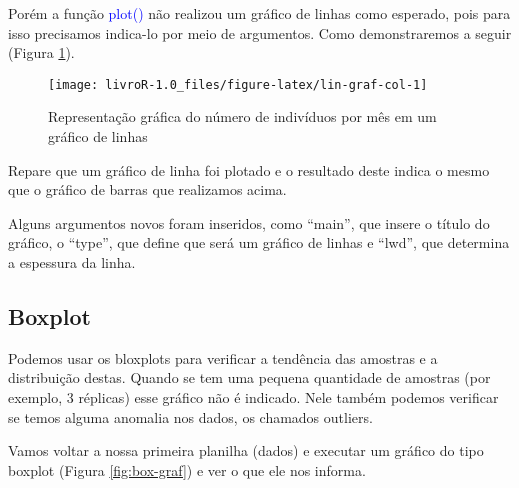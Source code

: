 \documentclass[14pt,titlepage, oneside, openany, a4paper]{book}
\newenvironment{Shaded}{\begin{snugshade}}{\end{snugshade}}
\newcommand{\DataTypeTok}[1]{\textcolor[rgb]{0.13,0.29,0.53}{#1}}
\newcommand{\KeywordTok}[1]{\textcolor[rgb]{0.13,0.29,0.53}{\textbf{#1}}}
\newcommand{\NormalTok}[1]{#1}
\newcommand{\OperatorTok}[1]{\textcolor[rgb]{0.81,0.36,0.00}{\textbf{#1}}}
\newcommand{\StringTok}[1]{\textcolor[rgb]{0.31,0.60,0.02}{#1}}
\begin{document}
Porém a função \textcolor{blue}{plot()} não realizou um gráfico de linhas como esperado, pois para isso precisamos indica-lo por meio de argumentos. Como demonstraremos a seguir (Figura \ref{fig:lin-graf-col}).

\begin{Shaded}
\end{Shaded}

\begin{figure}[H]
\texttt{[image: livroR-1.0\_files/figure-latex/lin-graf-col-1]} \caption{Representação gráfica do número de indivíduos por mês em um gráfico de linhas}\label{fig:lin-graf-col}
\end{figure}

Repare que um gráfico de linha foi plotado e o resultado deste indica o mesmo que o gráfico de barras que realizamos acima.

Alguns argumentos novos foram inseridos, como ``main'', que insere o título do gráfico, o ``type'', que define que será um gráfico de linhas e ``lwd'', que determina a espessura da linha.

\hypertarget{boxplot}{%
\subsection{Boxplot}\label{boxplot}}

Podemos usar os bloxplots para verificar a tendência das amostras e a distribuição destas. Quando se tem uma pequena quantidade de amostras (por exemplo, 3 réplicas) esse gráfico não é indicado. Nele também podemos verificar se temos alguma anomalia nos dados, os chamados outliers.

Vamos voltar a nossa primeira planilha (dados) e executar um gráfico do tipo boxplot (Figura \ref{fig:box-graf}) e ver o que ele nos informa.

\begin{Shaded}
\end{Shaded}
\end{document}
